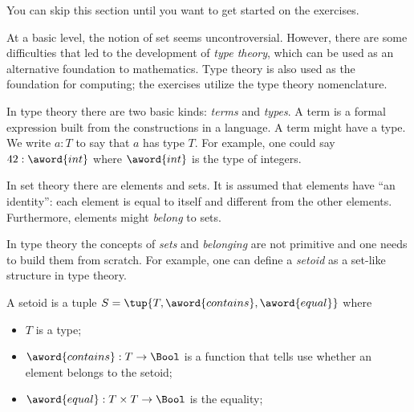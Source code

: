
\begin{remark}
    You can skip this section until you want to get started on the exercises.
\end{remark}

At a basic level, the notion of set seems uncontroversial.
However, there are some difficulties that led to the development of \emph{type theory},
which can be used as an alternative foundation to mathematics.
Type theory is also used as the foundation for computing; the exercises utilize the type theory nomenclature.


In type theory there are two basic kinds: \emph{terms} and \emph{types}.
A term is a formal expression built from the constructions in a language.
A term might have a type.
We write $a : T$ to say that $a$ has type $T$.
For example, one could say $42 : \aword{int}$ where $\aword{int}$ is the type of integers.

In set theory there are elements and sets.
It is assumed that elements have ``an identity'': each element is equal to itself and different from the other elements.
Furthermore, elements might \emph{belong} to sets.

In type theory the concepts of \emph{sets} and \emph{belonging} are not primitive and one needs to build them from scratch.
For example, one can define a \emph{setoid} as a set-like structure in type theory.

\begin{ctdefinition}[Setoid]
    A setoid is a tuple $S = \tup{T, \aword{contains}, \aword{equal}}$ where
    \begin{itemize}
        \item $T$ is a type;
        \item $\aword{contains}:T\to\Bool$ is a function that tells use whether an element belongs to the setoid;
        \item $\aword{equal}:T\times T\to\Bool$ is the equality;
    \end{itemize}
\end{ctdefinition}


